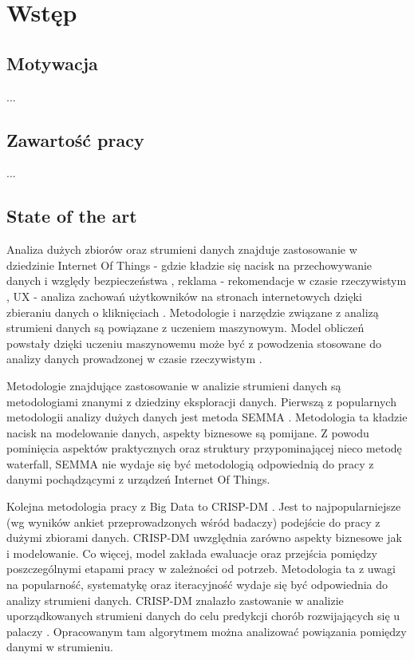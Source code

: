 \chapter{Wstęp}

\section{Motywacja}

...

\section{Zawartość pracy}

...


\section{State of the art}

Analiza dużych zbiorów oraz strumieni danych znajduje zastosowanie w dziedzinie Internet Of Things - gdzie kładzie się nacisk na przechowywanie danych i względy bezpieczeństwa \cite{Chui}, reklama - rekomendacje w czasie rzeczywistym \cite{Akter+Wamba}, UX - analiza zachowań użytkowników na stronach internetowych dzięki zbieraniu danych o kliknięciach \cite{Balachandran}. Metodologie i narzędzie związane z analizą strumieni danych są powiązane z uczeniem maszynowym. Model obliczeń powstały dzięki uczeniu maszynowemu może być z powodzenia stosowane do analizy danych prowadzonej w czasie rzeczywistym \cite{Brink+Richards+Fetherolf}.

Metodologie znajdujące zastosowanie w analizie strumieni danych są metodologiami znanymi z dziedziny eksploracji danych. Pierwszą z popularnych metodologii analizy dużych danych jest metoda SEMMA \cite{Semma}. Metodologia ta kładzie nacisk na modelowanie danych, aspekty biznesowe są pomijane. Z powodu pominięcia aspektów praktycznych oraz struktury przypominającej nieco metodę waterfall, SEMMA nie wydaje się być metodologią odpowiednią do pracy z danymi pochądzącymi z urządzeń Internet Of Things.

Kolejna metodologia pracy z Big Data to CRISP-DM \cite{Shearer}. Jest to najpopularniejsze (wg wyników ankiet przeprowadzonych wśród badaczy) podejście do pracy z dużymi zbiorami danych. CRISP-DM uwzględnia zarówno aspekty biznesowe jak i modelowanie. Co więcej, model zakłada ewaluacje oraz przejścia pomiędzy poszczególnymi etapami pracy w zależności od potrzeb. Metodologia ta z uwagi na popularność, systematykę oraz iteracyjność wydaje się być odpowiednia do analizy strumieni danych. CRISP-DM znalazło zastowanie w analizie uporządkowanych strumieni danych do celu predykcji chorób rozwijających się u palaczy \cite{Kalgotra+Sharda}. Opracowanym tam algorytmem można analizować powiązania pomiędzy danymi w strumieniu.

